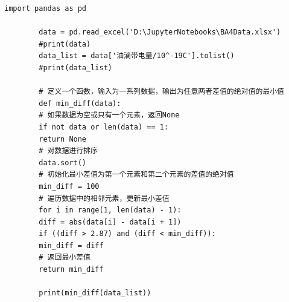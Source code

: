 \documentclass[dvipsnames, svgnames,a4paper,11pt]{article}
\begin{document}
	\begin{lstlisting}[style=pythonstyle,caption=代码记录1]
		import pandas as pd
		
		data = pd.read_excel('D:\JupyterNotebooks\BA4Data.xlsx')
		#print(data)
		data_list = data['油滴带电量/10^-19C'].tolist()
		#print(data_list)
		
		# 定义一个函数，输入为一系列数据，输出为任意两者差值的绝对值的最小值
		def min_diff(data):
		# 如果数据为空或只有一个元素，返回None
		if not data or len(data) == 1:
		return None
		# 对数据进行排序
		data.sort()
		# 初始化最小差值为第一个元素和第二个元素的差值的绝对值
		min_diff = 100
		# 遍历数据中的相邻元素，更新最小差值
		for i in range(1, len(data) - 1):
		diff = abs(data[i] - data[i + 1])
		if ((diff > 2.87) and (diff < min_diff)):
		min_diff = diff
		# 返回最小差值
		return min_diff
		
		print(min_diff(data_list)) 
		
	\end{lstlisting}
\end{document}
